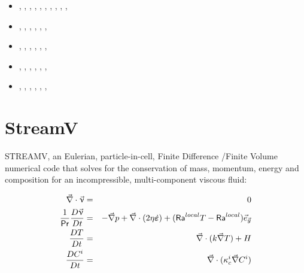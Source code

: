 \begin{small}
\begin{itemize}
                               \textcite{deli19},  \textcite{pact19}, \textcite{nana19},
                               \textcite{cohf19},  \textcite{crcm19},
                               \textcite{ulcw19},  \textcite{gicw19},
                               \textcite{jart19},  \textcite{jart19b}
\item[\twothousandtwenty]      \textcite{lalt20},  \textcite{gugb20},
                               \textcite{yabt20},  \textcite{arcf20}, 
                               \textcite{rits20},  \textcite{grlc20}, 
                               \textcite{scrt20},  \textcite{lorb20},
                               \textcite{bobm20},  \textcite{kacc20},
                               \textcite{uprc20}
\item[\twothousandtwentyone]   \textcite{roac21},  \textcite{lalt21}, \textcite{mebl21},
                               \textcite{gult21},  \textcite{gubt21}, \textcite{naka21},
                               \textcite{naka21}
\item[\twothousandtwentytwo]   \textcite{lids22},  \textcite{hulz22}, \textcite{adss22},
                               \textcite{bamo22},  \textcite{lalt22}, \textcite{gugt22},
                               \textcite{bota22}
\item[\twothousandtwentythree] \textcite{quzj23},  \textcite{titl23}, \textcite{lizl23},
                               \textcite{adsm23},  \textcite{gudl23}, \textcite{lelm23},
                               \textcite{naka23}
\item[\twothousandtwentyfour]  \textcite{jalt24},  \textcite{deba24}, \textcite{chrg24},
                               \textcite{masw24},  \textcite{shml24}, \textcite{lamt24},
                               \textcite{pagr24}
\end{itemize}
\end{small}

\section{StreamV} 

STREAMV, an Eulerian, particle-in-cell, Finite Difference /Finite
Volume numerical code that solves for the conservation of mass, momentum, energy and
composition for an incompressible, multi-component viscous fluid:

\begin{eqnarray}
\vec\nabla \cdot \vec\upnu &=& 0 \\
\frac{1}{{\mathsf{Pr}}} \frac{D \vec\upnu}{Dt} 
&=& -\vec\nabla p +\vec\nabla \cdot (2\eta\dot{\bm \varepsilon} )
+ ({\mathsf{Ra}}^{local} T - {\mathsf{Ra}}^{local} )\vec{e}_{\vec g}   \\
\frac{DT}{Dt} &=& \vec\nabla \cdot (k \vec\nabla T) + H \\
\frac{DC^i}{Dt} &=& \vec\nabla \cdot (\kappa_c^i \vec\nabla C^i )  
\end{eqnarray}

